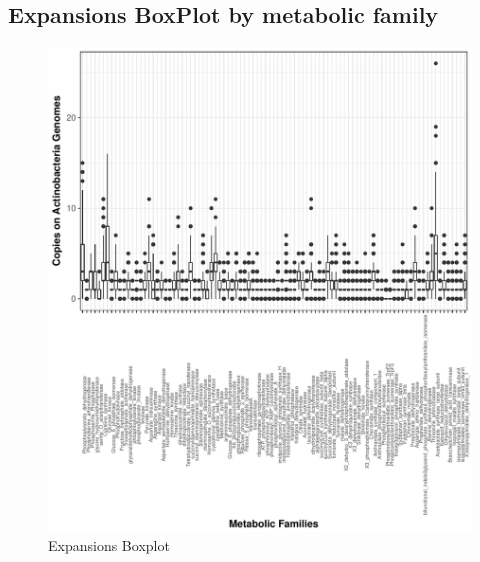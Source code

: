 \documentclass[12pt,twoside]{reedthesis}
\begin{document}
  \clearpage
  
  \subsection{Expansions BoxPlot by metabolic
  family}\label{expansions-boxplot-by-metabolic-family-1}
  
  \begin{Shaded}
  \begin{Highlighting}[]
  \NormalTok{(} \NormalTok{, } \NormalTok{,} \NormalTok{, } \NormalTok{)}
  \end{Highlighting}
  \end{Shaded}
  
  \begin{figure}[h!tbp]
  \centering
  \includegraphics[angle = 0,scale = 1]{chapter4/expansion_plotActinos.pdf}
  \caption[Expansions Boxplot]{\normalsize{Expansions Boxplot}}
  \label{fig:Actino_expansion_boxplot}
  \end{figure}
  
\end{document}
